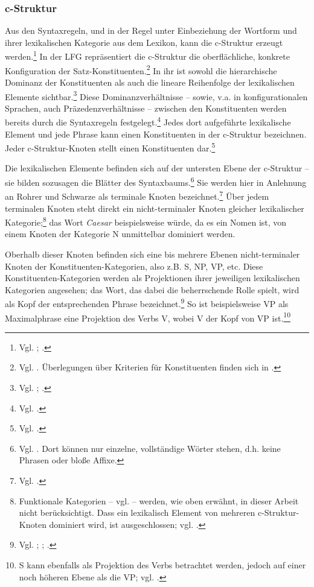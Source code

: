 \documentclass[12pt,a4paper]{article}
\begin{document}
\subsubsection{c-Struktur}
Aus den Syntaxregeln, und in der Regel unter Einbeziehung der Wortform und ihrer lexikalischen Kategorie aus dem Lexikon, kann die c-Struktur erzeugt werden.\footnote{Vgl. \cite[14]{Rohrer}; \cite[6]{Skript}.} In der LFG repräsentiert die c-Struktur die oberflächliche, konkrete Konfiguration der Satz-Konstituenten.\footnote{Vgl. \cite[47]{Dal}. Überlegungen über Kriterien für Konstituenten finden sich in \cite[48-9]{Dal}.} In ihr ist sowohl die hierarchische Dominanz der Konstituenten als auch die lineare Reihenfolge der lexikalischen Elemente sichtbar.\footnote{Vgl. \cite[7]{Dal}; \cite[13]{Rohrer}.} Diese Dominanzverhältnisse -- sowie, v.a. in konfigurationalen Sprachen, auch Präzedenzverhältnisse -- zwischen den Konstituenten werden bereits durch die Syntaxregeln festgelegt.\footnote{Vgl. \cite[19]{Rohrer}.} Jedes dort aufgeführte lexikalische Element und jede Phrase kann einen Konstituenten in der c-Struktur bezeichnen. Jeder c-Struktur-Knoten stellt einen Konstituenten dar.\footnote{Vgl. \cite[5]{Skript}.} 

Die lexikalischen Elemente befinden sich auf der untersten Ebene der c-Struktur -- sie bilden sozusagen die Blätter des Syntaxbaums.\footnote{Vgl. \cite[7]{Dal}. Dort können nur einzelne, vollständige Wörter stehen, d.h. keine Phrasen oder bloße Affixe.} Sie werden hier in Anlehnung an Rohrer und Schwarze als terminale Knoten bezeichnet.\footnote{Vgl. \cite[14; 61]{Rohrer}.} Über jedem terminalen Knoten steht direkt ein nicht-terminaler Knoten gleicher lexikalischer Kategorie;\footnote{Funktionale Kategorien -- vgl. \cite[46; 53; 63-4]{Dal} -- werden, wie oben erwähnt, in dieser Arbeit nicht berücksichtigt. Dass ein lexikalisch Element von mehreren c-Struktur-Knoten dominiert wird, ist ausgeschlossen; vgl. \cite[63]{Skript}.} das Wort \textit{Caesar} beispielsweise würde, da es ein Nomen ist, von einem Knoten der Kategorie N unmittelbar dominiert werden.

Oberhalb dieser Knoten befinden sich eine bis mehrere Ebenen nicht-terminaler Knoten der Konstituenten-Kategorien, also z.B. S, NP, VP, etc. Diese Konstituenten-Kategorien werden als Projektionen ihrer jeweiligen lexikalischen Kategorien angesehen; das Wort, das dabei die beherrschende Rolle spielt, wird als Kopf der entsprechenden Phrase bezeichnet.\footnote{Vgl. \cite[13; 15]{Rohrer}; \cite[64]{Dal}; \cite[5; 28]{Skript}.} So ist beispielsweise VP als Maximalphrase eine Projektion des Verbs V, wobei V der Kopf von VP ist.\footnote{S kann ebenfalls als Projektion des Verbs betrachtet werden, jedoch auf einer noch höheren Ebene als die VP; vgl. \cite[15]{Rohrer}.} 
\end{document}
